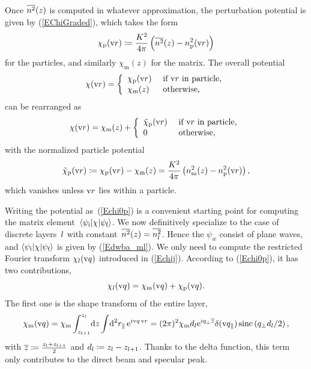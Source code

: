 Once $\overline{n^2}(z)$ is computed in whatever approximation,
the perturbation potential is given by (\ref{EChiGraded}),
which takes the form
\begin{equation}
  \chi_\text{p}(\text{v}{r}) \coloneqq  \frac{K^2}{4\pi}\left(\overline{n^2}(z)-n_\text{p}^2(\text{v}{r})\right)
\end{equation}
for the particles, and similarly $\chi_\text{m}(z)$ for the matrix.
The overall potential
\begin{equation}
  \chi(\text{v}{r})=\left\{\begin{array}{ll}
  \chi_\text{p}(\text{v}{r})&\text{~if $\text{v}{r}$ in particle,}\\[.2ex]
  \chi_\text{m}(z) &\text{~otherwise,} \end{array}\right.
\end{equation}
%
%
can be rearranged as
\begin{equation}\label{Echi0p}
  \chi(\text{v}{r})=\chi_\text{m}(z) + \left\{\begin{array}{ll}
  \tilde\chi_\text{p}(\text{v}{r})&\text{~if $\text{v}{r}$ in particle,}\\[.2ex]
  0 &\text{~otherwise,} \end{array}\right.
\end{equation}
with the normalized particle potential
\begin{equation}
  \tilde\chi_\text{p}(\text{v}{r})
  \coloneqq  \chi_\text{p}(\text{v}{r})-\chi_\text{m}(z)
  = \frac{K^2}{4\pi}\left(n_\text{m}^2(z)-n_\text{p}^2(\text{v}{r})\right),
\end{equation}
%
which vanishes unless $\text{v}{r}$ lies within a particle.

Writing the potential as~(\ref{Echi0p}) is a convenient starting point
for computing the matrix element~$\left\langle\psi_{\text{i}}|\chi|\psi_{\text{f}}\right\rangle$.
We now definitively specialize to the case of discrete layers~$l$
with constant~$\overline{n^2}(z)=\overline{n_l^2}$.
Hence the $\psi_{w}$ consist of plane waves,
and $\left\langle\psi_{\text{i}}|\chi|\psi_{\text{f}}\right\rangle$ is given by (\ref{Edwba_ml}).
We only need to compute the restricted Fourier transform
$\chi_l(\text{v}{q})$ introduced in (\ref{Echij}).
According to (\ref{Echi0p}),
it has two contributions,
\begin{equation}\label{Echijmp}
  \chi_l(\text{v}{q}) = \chi_\text{m}(\text{v}{q}) + \chi_\text{p}(\text{v}{q}).
\end{equation}
The first one is the shape transform of the entire layer,
\begin{equation}
  \chi_\text{m}(\text{v}{q})
  = \chi_\text{m} \int_{z_{l+1}}^{z_{l}}\!\text{d} z \int\!\text{d}^2r_\parallel\, \text{e}^{i\text{v}{q}\,\text{v}{r}}
  = (2\pi)^2 \chi_\text{m} d_l \text{e}^{i q_\perp \overline{z}}  \delta(\text{v}{q}_\parallel) \operatorname{sinc}\left( q_\perp d_l /2 \right),
\end{equation}
with $\overline{z} \coloneqq \frac{z_l + z_{l+1}}{2}$ and $d_l \coloneqq z_l - z_{l+1}$.
Thanks to the delta function,
this term only contributes to the direct beam and specular peak.


